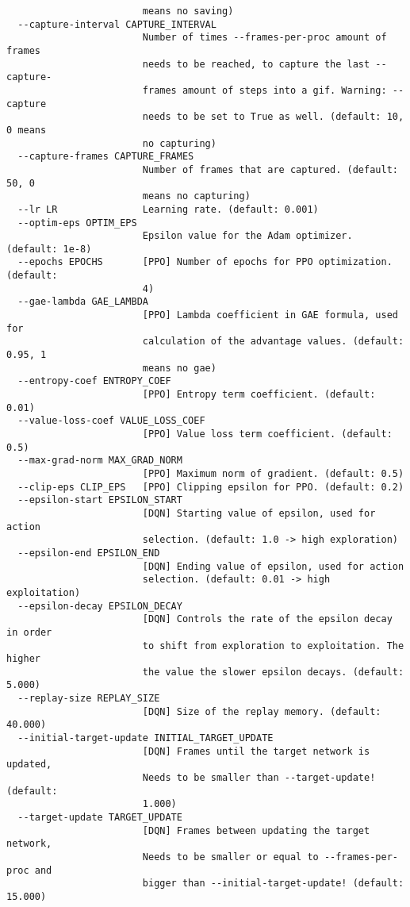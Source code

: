 {\begin{verbatim}
                        means no saving)
  --capture-interval CAPTURE_INTERVAL
                        Number of times --frames-per-proc amount of frames
                        needs to be reached, to capture the last --capture-
                        frames amount of steps into a gif. Warning: --capture
                        needs to be set to True as well. (default: 10, 0 means
                        no capturing)
  --capture-frames CAPTURE_FRAMES
                        Number of frames that are captured. (default: 50, 0
                        means no capturing)
  --lr LR               Learning rate. (default: 0.001)
  --optim-eps OPTIM_EPS
                        Epsilon value for the Adam optimizer. (default: 1e-8)
  --epochs EPOCHS       [PPO] Number of epochs for PPO optimization. (default:
                        4)
  --gae-lambda GAE_LAMBDA
                        [PPO] Lambda coefficient in GAE formula, used for
                        calculation of the advantage values. (default: 0.95, 1
                        means no gae)
  --entropy-coef ENTROPY_COEF
                        [PPO] Entropy term coefficient. (default: 0.01)
  --value-loss-coef VALUE_LOSS_COEF
                        [PPO] Value loss term coefficient. (default: 0.5)
  --max-grad-norm MAX_GRAD_NORM
                        [PPO] Maximum norm of gradient. (default: 0.5)
  --clip-eps CLIP_EPS   [PPO] Clipping epsilon for PPO. (default: 0.2)
  --epsilon-start EPSILON_START
                        [DQN] Starting value of epsilon, used for action
                        selection. (default: 1.0 -> high exploration)
  --epsilon-end EPSILON_END
                        [DQN] Ending value of epsilon, used for action
                        selection. (default: 0.01 -> high exploitation)
  --epsilon-decay EPSILON_DECAY
                        [DQN] Controls the rate of the epsilon decay in order
                        to shift from exploration to exploitation. The higher
                        the value the slower epsilon decays. (default: 5.000)
  --replay-size REPLAY_SIZE
                        [DQN] Size of the replay memory. (default: 40.000)
  --initial-target-update INITIAL_TARGET_UPDATE
                        [DQN] Frames until the target network is updated,
                        Needs to be smaller than --target-update! (default:
                        1.000)
  --target-update TARGET_UPDATE
                        [DQN] Frames between updating the target network,
                        Needs to be smaller or equal to --frames-per-proc and
                        bigger than --initial-target-update! (default: 15.000)
    \end{verbatim}
}
